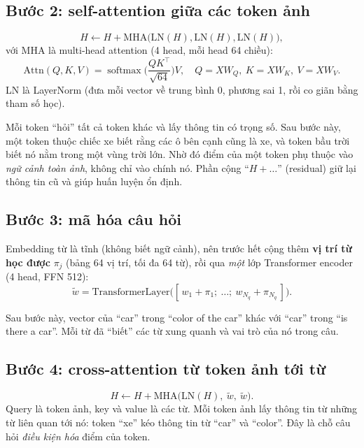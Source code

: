 \documentclass[11pt,a4paper]{article}
\newcommand{\softmax}{\operatorname{softmax}}
\begin{document}
\subsection{Bước 2: self-attention giữa các token ảnh}
\begin{equation}
H\leftarrow H+\mathrm{MHA}\big(\mathrm{LN}(H),\mathrm{LN}(H),\mathrm{LN}(H)\big),
\end{equation}
với $\mathrm{MHA}$ là multi-head attention (4 head, mỗi head 64 chiều):
\begin{equation}
\mathrm{Attn}(Q,K,V)=\softmax\!\Big(\frac{QK^\top}{\sqrt{64}}\Big)V,\quad Q=XW_Q,\ K=XW_K,\ V=XW_V.
\end{equation}
LN là LayerNorm (đưa mỗi vector về trung bình 0, phương sai 1, rồi co giãn bằng tham số học).

\begin{trucgiac}
Mỗi token ``hỏi'' tất cả token khác và lấy thông tin có trọng số. Sau bước này, một token thuộc chiếc xe biết rằng các ô bên cạnh cũng là xe, và token bầu trời biết nó nằm trong một vùng trời lớn. Nhờ đó điểm của một token phụ thuộc vào \emph{ngữ cảnh toàn ảnh}, không chỉ vào chính nó. Phần cộng ``$H+\dots$'' (residual) giữ lại thông tin cũ và giúp huấn luyện ổn định.
\end{trucgiac}

\subsection{Bước 3: mã hóa câu hỏi}
Embedding từ là tĩnh (không biết ngữ cảnh), nên trước hết cộng thêm \textbf{vị trí từ học được} $\pi_j$ (bảng 64 vị trí, tối đa 64 từ), rồi qua \emph{một} lớp Transformer encoder (4 head, FFN 512):
\begin{equation}
\tilde w=\mathrm{TransformerLayer}\big([\,w_1+\pi_1;\ \dots;\ w_{N_q}+\pi_{N_q}\,]\big).
\end{equation}
\begin{trucgiac}
Sau bước này, vector của ``car'' trong ``color of the car'' khác với ``car'' trong ``is there a car''. Mỗi từ đã ``biết'' các từ xung quanh và vai trò của nó trong câu.
\end{trucgiac}

\subsection{Bước 4: cross-attention từ token ảnh tới từ}
\begin{equation}
H\leftarrow H+\mathrm{MHA}\big(\mathrm{LN}(H),\ \tilde w,\ \tilde w\big).
\end{equation}
Query là token ảnh, key và value là các từ. Mỗi token ảnh lấy thông tin từ những từ liên quan tới nó: token ``xe'' kéo thông tin từ ``car'' và ``color''. Đây là chỗ câu hỏi \emph{điều kiện hóa} điểm của token.
\end{document}
